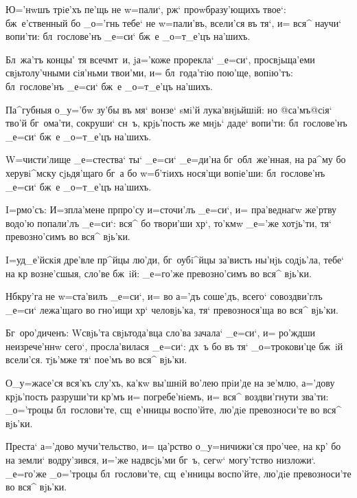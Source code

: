 
Ю='нwшъ трiе'хъ пе'щь не w=пали`, рж` 
проwбразу'ющихъ твое`: бж~е'ственный бо _о='гнь тебе` не 
w=пали'въ, всели'ся въ тя`, и= вся^ научи` вопи'ти: 
бл~гослове'нъ _е=си` бж~е _о=т_е'цъ на'шихъ.

Бл~жа'тъ концы' тя всеч мт~и, jа='коже прорекла` 
_е=си`, просвjьща'еми свjьтолу'чными сiя'ньми твои'ми, и= 
бл~года'тiю пою'ще, вопiю'тъ: бл~гослове'нъ _е=си` бж~е 
_о=т_е'цъ на'шихъ.

Па^губныя о_у='бw зу'бы въ мя` вонзе` sмi'й 
лука'внjьйшiй: но @са'мъ@{сiя`} тво'й бг~ома'ти, 
сокруши` сн~ъ, крjь'пость же мнjь` даде` вопи'ти: 
бл~гослове'нъ _е=си` бж~е _о=т_е'цъ на'шихъ.

W=чисти'лище _е=стества` ты` _е=си` _е=ди'на 
бг~обл~же'нная, на ра^му бо херувi^мску сjьдя'щаго бг~а 
бо w=б'тiихъ нося'щи вопiе'ши: бл~гослове'нъ _е=си` 
бж~е _о=т_е'цъ на'шихъ.


I=рмо'съ: И=з\ъ пла'мене прп ро'су и=сточи'лъ 
_е=си`, и= пра'веднагw же'ртву водо'ю попали'лъ _е=си`: 
вся^ бо твори'ши хр`, то'кмw _е='же хотjь'ти, тя` 
превозно'симъ во вся^ вjь'ки.

I=уд_е'йскiя дре'вле пр^йцы лю'ди, 
бг~оубi^йцы за'висть ны'нjь содjь'ла, тебе` на кр 
возне'сшыя, сло'ве бж~iй: _е=го'же превозно'симъ во вся^ 
вjь'ки.

Нб кру'га не w=ста'вилъ _е=си`, и= во а='дъ 
соше'дъ, всего` совоздви'глъ _е=си` лежа'щаго во гно'ищи 
хр` человjь'ка, тя` превознося'ща во вся^ вjь'ки.

Бг~оро'диченъ: W\т свjь'та свjьтода'вца сло'ва зачала` 
_е=си`, и= ро'ждши неизрече'ннw сего`, просла'вилася 
_е=си`: дх~ъ бо въ тя` _о=трокови'це бж~iй всели'ся. 
тjь'мже тя` пое'мъ во вся^ вjь'ки. 


О_у=жасе'ся вся'къ слу'хъ, ка'кw вы'шнiй во'лею 
прiи'де на зе'млю, а='дову крjь'пость разруши'ти 
кр'мъ и= погребе'нiемъ, и= вся^ воздви'гнути зва'ти: 
_о='троцы бл~гослови'те, сщ~е'нницы воспо'йте, лю'дiе 
превозноси'те во вся^ вjь'ки.

Преста` а='дово мучи'тельство, и= ца'рство 
о_у=ничижи'ся про'чее, на кр' бо на земли` 
водру'зився, и='же над\ъ всjь'ми бг~ъ, сегw` могу'тство 
низложи`. _е=го'же _о='троцы бл~гослови'те, сщ~е'нницы 
воспо'йте, лю'дiе превозноси'те во вся^ вjь'ки.

